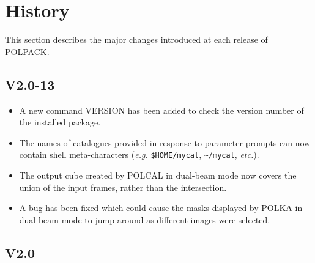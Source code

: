 \documentclass[twoside,11pt]{article}
\newcommand{\htmlref}[2]{#1}
\renewcommand{\_}{\texttt{\symbol{95}}}
\begin{document}
\section{\label{APP:HISTORY}History}
This section describes the major changes introduced at each release of
POLPACK.
\subsection{V2.0-13}

\begin{itemize}

\item A new command \htmlref{VERSION}{VERSION} has been added to check
the version number of the installed package.

\item The names of catalogues provided in response to parameter prompts 
can now contain shell meta-characters (\emph{e.g.} \verb+$HOME/mycat+, 
\verb+~/mycat+, \emph{etc.}).

\item The output cube created by POLCAL in dual-beam mode now covers the
union of the input frames, rather than the intersection.

\item A bug has been fixed which could cause the masks displayed by POLKA 
in dual-beam mode to jump around as different images were selected.

\end{itemize}

\subsection{V2.0}
\end{document}
